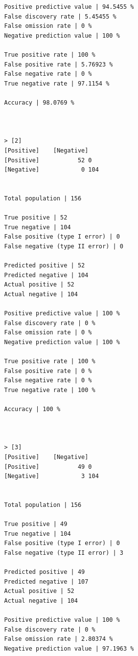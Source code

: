 \documentclass{classrep}
\begin{document}
{{{\begin{lstlisting}
                Positive predictive value | 94.5455 %
                False discovery rate | 5.45455 %
                False omission rate | 0 %
                Negative prediction value | 100 %

                True positive rate | 100 %
                False positive rate | 5.76923 %
                False negative rate | 0 %
                True negative rate | 97.1154 %

                Accuracy | 98.0769 %



                > [2]
                [Positive]    [Negative]
                [Positive]           52 0
                [Negative]            0 104


                Total population | 156

                True positive | 52
                True negative | 104
                False positive (type I error) | 0
                False negative (type II error) | 0

                Predicted positive | 52
                Predicted negative | 104
                Actual positive | 52
                Actual negative | 104

                Positive predictive value | 100 %
                False discovery rate | 0 %
                False omission rate | 0 %
                Negative prediction value | 100 %

                True positive rate | 100 %
                False positive rate | 0 %
                False negative rate | 0 %
                True negative rate | 100 %

                Accuracy | 100 %



                > [3]
                [Positive]    [Negative]
                [Positive]           49 0
                [Negative]            3 104


                Total population | 156

                True positive | 49
                True negative | 104
                False positive (type I error) | 0
                False negative (type II error) | 3

                Predicted positive | 49
                Predicted negative | 107
                Actual positive | 52
                Actual negative | 104

                Positive predictive value | 100 %
                False discovery rate | 0 %
                False omission rate | 2.80374 %
                Negative prediction value | 97.1963 %


\end{lstlisting}}}}
\end{document}
